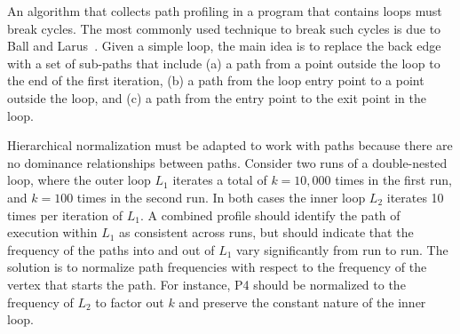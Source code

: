 
An algorithm that collects path profiling in a program that contains
loops must break cycles.  The most commonly used technique to break
such cycles is due to Ball and Larus~\cite{BallLarusMICRO96}. Given a
simple loop, the main idea is to replace the back edge with a set of
sub-paths that include (a) a path from a point outside the loop to the
end of the first iteration, (b) a path from the loop entry point to a
point outside the loop, and (c) a path from the entry point to the
exit point in the loop.

Hierarchical normalization must be adapted to work with paths because
there are no dominance relationships between paths. Consider two runs
of a double-nested loop, where the outer
loop $L_1$ iterates a total of $k=10,000$ times in the first run, and
$k=100$ times in the second run.  In both cases the inner loop $L_2$
iterates 10 times per iteration of $L_1$.  A combined profile should
identify the path of execution within $L_1$ as consistent across runs,
but should indicate that the frequency of the paths into and out of
$L_1$ vary significantly from run to run. The solution is to normalize
path frequencies with respect to the frequency of the vertex that
starts the path.  For instance, P4 should be normalized to the
frequency of $L_2$ to factor out $k$ and preserve the constant nature
of the inner loop.




